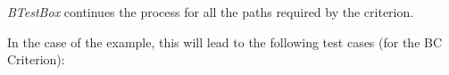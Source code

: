 \documentclass[runningheads]{llncs}
\begin{document}

\textit{BTestBox} continues the process for all the paths required by the criterion.




In the case of the example, this will lead to the following test cases (for the BC Criterion):




\end{document}

